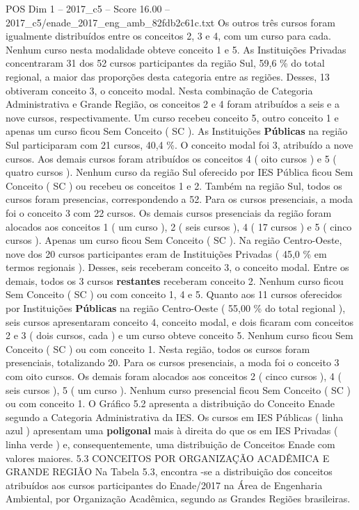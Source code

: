 \begin{textsample}{POS Dim 1 – 2017\_c5 – Score 16.00 – 2017\_c5/enade\_2017\_eng\_amb\_82fdb2c61c.txt}
Os outros três cursos foram igualmente distribuídos entre os conceitos 2, 3 e 4, com um curso para cada.
Nenhum curso nesta modalidade obteve conceito 1 e 5.
As Instituições Privadas concentraram 31 dos 52 cursos participantes da região Sul, 59,6 \% do total regional, a maior das proporções desta categoria entre as regiões.
Desses, 13 obtiveram conceito 3, o conceito modal.
Nesta combinação de Categoria Administrativa e Grande Região, os conceitos 2 e 4 foram atribuídos a seis e a nove cursos, respectivamente.
Um curso recebeu conceito 5, outro conceito 1 e apenas um curso ficou Sem Conceito ( SC ).
As Instituições \textbf{Públicas} na região Sul participaram com 21 cursos, 40,4 \%.
O conceito modal foi 3, atribuído a nove cursos.
Aos demais cursos foram atribuídos os conceitos 4 ( oito cursos ) e 5 ( quatro cursos ).
Nenhum curso da região Sul oferecido por IES Pública ficou Sem Conceito ( SC ) ou recebeu os conceitos 1 e 2.
Também na região Sul, todos os cursos foram presencias, correspondendo a 52.
Para os cursos presenciais, a moda foi o conceito 3 com 22 cursos.
Os demais cursos presenciais da região foram alocados aos conceitos 1 ( um curso ), 2 ( seis cursos ), 4 ( 17 cursos ) e 5 ( cinco cursos ).
Apenas um curso ficou Sem Conceito ( SC ).
Na região Centro-Oeste, nove dos 20 cursos participantes eram de Instituições Privadas ( 45,0 \% em termos regionais ).
Desses, seis receberam conceito 3, o conceito modal.
Entre os demais, todos os 3 cursos \textbf{restantes} receberam conceito 2.
Nenhum curso ficou Sem Conceito ( SC ) ou com conceito 1, 4 e 5.
Quanto aos 11 cursos oferecidos por Instituições \textbf{Públicas} na região Centro-Oeste ( 55,00 \% do total regional ), seis cursos apresentaram conceito 4, conceito modal, e dois ficaram com conceitos 2 e 3 ( dois cursos, cada ) e um curso obteve conceito 5.
Nenhum curso ficou Sem Conceito ( SC ) ou com conceito 1.
Nesta região, todos os cursos foram presenciais, totalizando 20.
Para os cursos presenciais, a moda foi o conceito 3 com oito cursos.
Os demais foram alocados aos conceitos 2 ( cinco cursos ), 4 ( seis cursos ), 5 ( um curso ).
Nenhum curso presencial ficou Sem Conceito ( SC ) ou com conceito 1.
O Gráfico 5.2 apresenta a distribuição do Conceito Enade segundo a Categoria Administrativa da IES.
Os cursos em IES Públicas ( linha azul ) apresentam uma \textbf{poligonal} mais à direita do que os em IES Privadas ( linha verde ) e, consequentemente, uma distribuição de Conceitos Enade com valores maiores. 5.3 CONCEITOS POR ORGANIZAÇÃO ACADÊMICA E GRANDE REGIÃO Na Tabela 5.3, encontra -se a distribuição dos conceitos atribuídos aos cursos participantes do Enade/2017 na Área de Engenharia Ambiental, por Organização Acadêmica, segundo as Grandes Regiões brasileiras.

\end{textsample}
